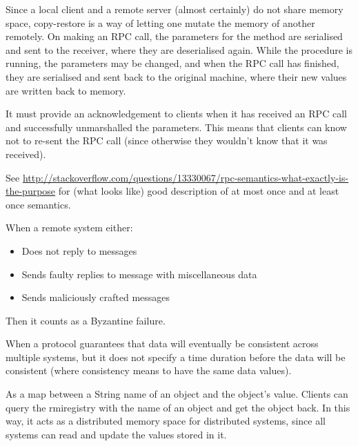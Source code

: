 Since a local client and a remote server (almost certainly) do not share memory
space, copy-restore is a way of letting one mutate the memory of another
remotely. On making an RPC call, the parameters for the method are serialised
and sent to the receiver, where they are deserialised again. While the procedure
is running, the parameters may be changed, and when the RPC call has finished,
they are serialised and sent back to the original machine, where their new
values are written back to memory.


It must provide an acknowledgement to clients when it has received an RPC call
and successfully unmarshalled the parameters. This means that clients can know
not to re-sent the RPC call (since otherwise they wouldn't know that it was
received).

See \url{http://stackoverflow.com/questions/13330067/rpc-semantics-what-exactly-is-the-purpose}
for (what looks like) good description of at most once and at least once
semantics.


When a remote system either:

\begin{itemize}
  \item Does not reply to messages
  \item Sends faulty replies to message with miscellaneous data
  \item Sends maliciously crafted messages
\end{itemize}

Then it counts as a Byzantine failure.


When a protocol guarantees that data will eventually be consistent across
multiple systems, but it does not specify a time duration before the data will
be consistent (where consistency means to have the same data values).


As a map between a String name of an object and the object's value. Clients can
query the rmiregistry with the name of an object and get the object back. In
this way, it acts as a distributed memory space for distributed systems, since
all systems can read and update the values stored in it.

